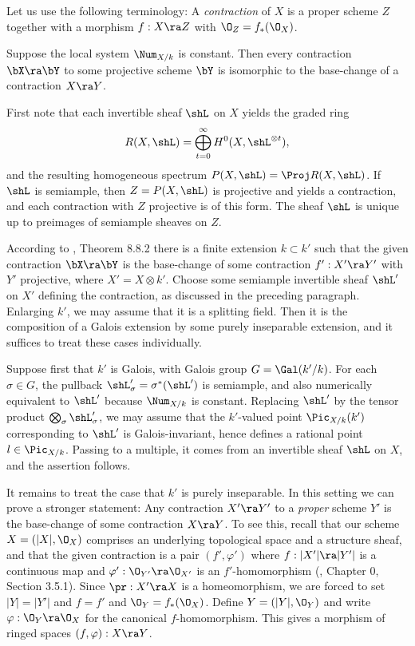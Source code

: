 Let us use the following terminology: A \emph{contraction} of $X$ is a proper scheme $Z$ together with a   morphism
$f:X\ra Z$ with $\O_Z=f_*(\O_X)$.

\begin{theorem}
\notready
\label{projective contractions}
Suppose  the local system $\Num_{X/k}$ is constant.
Then every contraction $\bX\ra \bY$  to some projective scheme $\bY$ is isomorphic to the base-change of a contraction $X\ra Y$.
\end{theorem}

\proof
First note that each  invertible sheaf $\shL$ on $X$ yields the graded ring
$$
R(X,\shL)=\bigoplus_{t=0}^\infty H^0(X,\shL^{\otimes t}),
$$
and the resulting homogeneous spectrum $P(X,\shL)=\Proj R(X,\shL)$. If $\shL$ is semiample,
then $Z=P(X,\shL)$ is projective and yields a contraction, and each   contraction with $Z$ projective is of this form.
The sheaf  $\shL$ is unique up to preimages of semiample sheaves on $Z$.

According to \cite{EGA-IVc}, Theorem 8.8.2 there is a finite   extension $k\subset k'$
such that the given contraction $\bX\ra \bY$ is the base-change of some contraction $f':X'\ra Y'$
with $Y'$ projective, where $X'=X\otimes k'$. Choose some semiample invertible sheaf $\shL'$
on $X'$ defining the contraction, as discussed in the preceding paragraph.
Enlarging $k'$, we may assume that it is a splitting field. Then it is the composition
of a Galois extension by some purely inseparable extension, and it suffices to treat these cases
individually.

Suppose first that $k'$ is Galois, with   Galois group $G=\Gal(k'/k)$.
For each $\sigma\in G$, the pullback $\shL'_\sigma=\sigma^*(\shL')$ is semiample, and also numerically equivalent to $\shL'$
because $\Num_{X/k}$ is constant.
Replacing $\shL'$ by the tensor product $\bigotimes_\sigma\shL'_\sigma$, we may assume that the $k'$-valued
point $\Pic_{X/k}(k')$ corresponding to $\shL'$ is Galois-invariant, hence defines a rational point $l\in\Pic_{X/k}$.
Passing to a multiple, it comes from an invertible sheaf $\shL$ on $X$, and the assertion follows.

It remains to treat the case that $k'$ is purely inseparable.
In this setting we can prove a    stronger statement:
Any contraction $X'\ra Y'$ to a \emph{proper}  scheme $Y'$ is the base-change of some contraction $X\ra Y$.
To see this, recall that our scheme $X=(|X|,\O_X)$ comprises an underlying topological space and a structure sheaf,
and that the given contraction is a pair $(f',\varphi')$ where $f:|X'|\ra |Y'| $ is a continuous map  and
$\varphi':\O_{Y'}\ra\O_{X'}$ is an $f'$-homomorphism (\cite{EGA-I}, Chapter 0, Section 3.5.1).
Since $\pr:X'\ra X$ is a homeomorphism, we are forced to set  $|Y|=|Y'|$ and $f=f'$  and   $\O_Y=f_*(\O_X)$.
Define $Y=(|Y|,\O_Y)$ and write  $\varphi:\O_Y\ra\O_X$ for the canonical $f$-homomorphism.
This gives a morphism   of ringed spaces $(f,\varphi):X\ra Y$.

